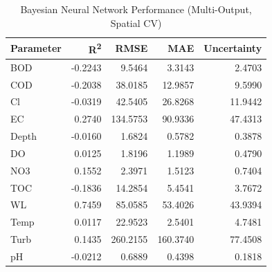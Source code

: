 \begin{table}[htbp]
\centering
\caption{Bayesian Neural Network Performance (Multi-Output, Spatial CV)}
\label{tab:bnn_results}
\begin{tabular}{lrrrr}
\hline
\textbf{Parameter} & \textbf{R\textsuperscript{2}} & \textbf{RMSE} & \textbf{MAE} & \textbf{Uncertainty} \\
\hline
  BOD & -0.2243 & 9.5464 & 3.3143 & 2.4703 \\
  COD & -0.2038 & 38.0185 & 12.9857 & 9.5990 \\
  Cl & -0.0319 & 42.5405 & 26.8268 & 11.9442 \\
  EC & 0.2740 & 134.5753 & 90.9336 & 47.4313 \\
  Depth & -0.0160 & 1.6824 & 0.5782 & 0.3878 \\
  DO & 0.0125 & 1.8196 & 1.1989 & 0.4790 \\
  NO3 & 0.1552 & 2.3971 & 1.5123 & 0.7404 \\
  TOC & -0.1836 & 14.2854 & 5.4541 & 3.7672 \\
  WL & 0.7459 & 85.0585 & 53.4026 & 43.9394 \\
  Temp & 0.0117 & 22.9523 & 2.5401 & 4.7481 \\
  Turb & 0.1435 & 260.2155 & 160.3740 & 77.4508 \\
  pH & -0.0212 & 0.6889 & 0.4398 & 0.1818 \\
\hline
\end{tabular}
\end{table}